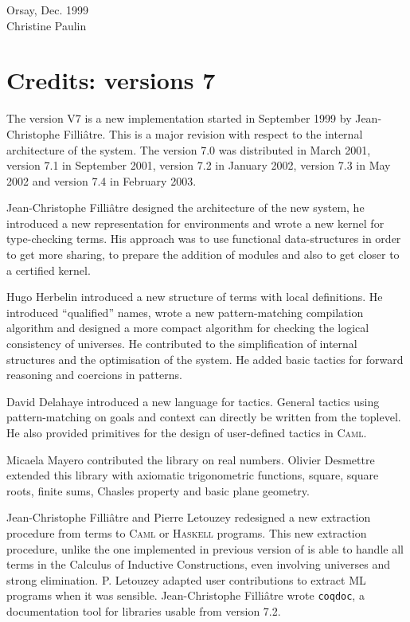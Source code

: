 \begin{flushright}
Orsay, Dec. 1999\\
Christine Paulin
\end{flushright}


\section*{Credits: versions 7}

The version V7 is a new implementation started in September 1999 by
Jean-Christophe Filliâtre. This is a major revision with respect to
the internal architecture of the system.  The \Coq{} version 7.0 was
distributed in March 2001, version 7.1 in September 2001, version
7.2 in January 2002, version 7.3 in May 2002 and version 7.4 in
February 2003.

Jean-Christophe Filliâtre designed the architecture of the new system, he
introduced a new representation for environments and wrote a new kernel
for type-checking terms. His approach was to use functional
data-structures in order to get more sharing, to prepare the addition
of modules and also to get closer to a certified kernel.

Hugo Herbelin introduced a new structure of terms with local
definitions. He introduced ``qualified'' names, wrote a new
pattern-matching compilation algorithm and designed a more compact
algorithm for checking the logical consistency of universes. He
contributed to the simplification of {\Coq} internal structures and the
optimisation of the system. He added basic tactics for forward
reasoning and coercions in patterns.

David Delahaye introduced a new language for tactics. General tactics
using pattern-matching on goals and context can directly be written
from the {\Coq} toplevel. He also provided primitives for the design
of user-defined tactics in \textsc{Caml}.

Micaela Mayero contributed the library on real numbers.
Olivier Desmettre extended this library with axiomatic
trigonometric functions, square, square roots, finite sums, Chasles
property and basic plane geometry.

Jean-Christophe Filliâtre and Pierre Letouzey redesigned a new
extraction procedure from \Coq{} terms to \textsc{Caml} or
\textsc{Haskell} programs. This new 
extraction procedure, unlike the one implemented in previous version
of \Coq{} is able to handle all terms in the Calculus of Inductive
Constructions, even involving universes and strong elimination. P.
Letouzey adapted user contributions to extract ML programs when it was
sensible.
Jean-Christophe Filliâtre wrote \verb=coqdoc=, a documentation
tool for {\Coq} libraries usable from version 7.2.

